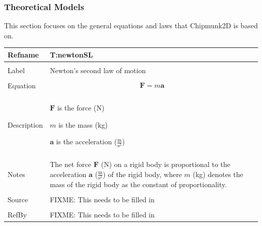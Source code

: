 \documentclass[12pt]{article}
\begin{document}
\subsubsection{Theoretical Models}
\label{Sec:TMs}
This section focuses on the general equations and laws that Chipmunk2D is based on.
~\newline
\noindent \begin{minipage}{\textwidth}
\begin{tabular}{p{} p{}}
\toprule \textbf{Refname} & \textbf{T:newtonSL}
\label{T:newtonSL}
\\ \midrule \\
Label & Newton's second law of motion
\\ \midrule \\
Equation & \begin{dmath}
           \mathbf{F}=m \mathbf{a}
           \end{dmath}
\\ \midrule \\
Description & \begin{symbDescription}
              \item{$\mathbf{F}$ is the force (N)}
              \item{$m$ is the mass (kg)}
              \item{$\mathbf{a}$ is the acceleration ($\frac{\text{m}}{\text{s}^{2}}$)}
              \end{symbDescription}
\\ \midrule \\
Notes & The net force $\mathbf{F}$ (N) on a rigid body is proportional to the acceleration $\mathbf{a}$ ($\frac{\text{m}}{\text{s}^{2}}$) of the rigid body, where $m$ (kg) denotes the mass of the rigid body as the constant of proportionality.
\\ \midrule \\
Source & FIXME: This needs to be filled in
\\ \midrule \\
RefBy & FIXME: This needs to be filled in
\\ \bottomrule \end{tabular}
\end{minipage}\\
~\newline
\end{document}
